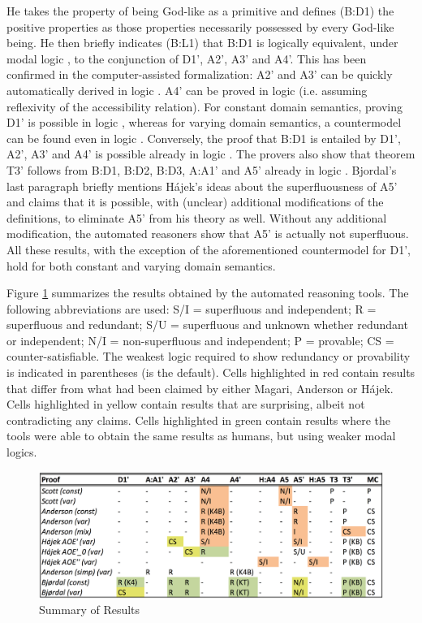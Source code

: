 \documentclass{birkjour}
\theoremstyle{definition}
\theoremstyle{remark}
\numberwithin{equation}{section}
\begin{document}
He takes the property of being God-like as a primitive and defines (B:D1) the positive properties as
those properties necessarily possessed by every God-like being. He
then briefly indicates (B:L1) that B:D1 is logically equivalent, under
modal logic \SFour, to the conjunction of D1', A2', A3' and A4'. This
has been confirmed in the computer-assisted formalization: A2' and A3'
can be quickly automatically derived in logic \K. A4' can be proved in
logic \KT (i.e. assuming reflexivity of the accessibility relation).
For constant domain semantics, proving D1' is possible in logic \KFour,
whereas for varying domain semantics, a countermodel can be found
even in logic \SFive. Conversely, the proof that B:D1 is entailed by
D1', A2', A3' and A4' is possible already in logic \K. The provers
also show that theorem T3' follows from B:D1, B:D2, B:D3, A:A1' and
A5' already in logic \KB. Bjordal's last paragraph briefly mentions
Hájek's ideas about the superfluousness of A5' and claims that it is
possible, with (unclear) additional modifications of the definitions,
to eliminate A5' from his theory as well. Without any additional
modification, the automated reasoners show that A5' is actually not
superfluous. All these results, with the exception of the
aforementioned countermodel for D1', hold for both constant and
varying domain semantics.

Figure \ref{fig:summary} summarizes the results obtained by the automated reasoning tools. The following abbreviations are used: S/I = superfluous and independent; R = superfluous and redundant; S/U = superfluous and unknown whether redundant or independent; N/I = non-superfluous and independent; P = provable; CS = counter-satisfiable. The weakest logic required to show redundancy or provability is indicated in parentheses (\K is the default). 
Cells highlighted in red contain results that differ from what had been claimed by either Magari, Anderson or Hájek. Cells highlighted in yellow contain results that are surprising, albeit not contradicting any claims. Cells highlighted in green contain results where the tools were able to obtain the same results as humans, but using weaker modal logics.

\begin{figure}
\includegraphics[width=\textwidth]{Summary.png}
\caption{Summary of Results}
\label{fig:summary}
\end{figure}
\end{document}
